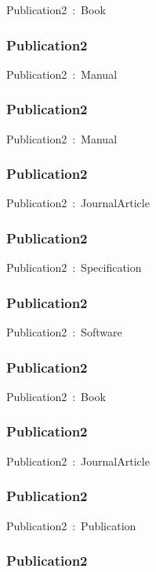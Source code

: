 \documentclass{article}
\begin{document}
Publication2~:~Book

\subsubsection*{Publication2}

Publication2~:~Manual

\subsubsection*{Publication2}

Publication2~:~Manual

\subsubsection*{Publication2}

Publication2~:~JournalArticle

\subsubsection*{Publication2}

Publication2~:~Specification

\subsubsection*{Publication2}

Publication2~:~Software

\subsubsection*{Publication2}

Publication2~:~Book

\subsubsection*{Publication2}

Publication2~:~JournalArticle

\subsubsection*{Publication2}

Publication2~:~Publication

\subsubsection*{Publication2}
\end{document}
